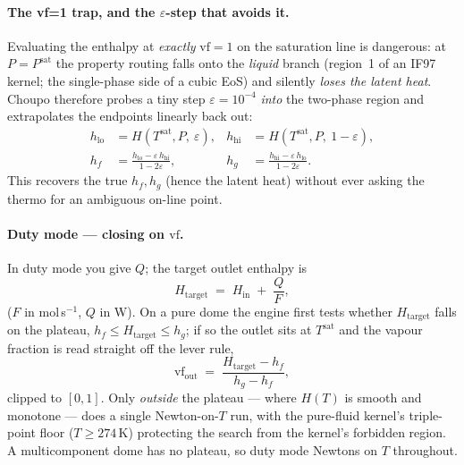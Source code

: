 \documentclass[11pt,a4paper]{article}
\newcommand{\Psat}{P^{\mathrm{sat}}}
\begin{document}
\paragraph{The vf=1 trap, and the $\varepsilon$-step that avoids it.}  Evaluating
the enthalpy at \emph{exactly} $\mathrm{vf}=1$ on the saturation line is
dangerous: at $P = \Psat$ the property routing falls onto the \emph{liquid}
branch (region~1 of an IF97 kernel; the single-phase side of a cubic EoS) and
silently \emph{loses the latent heat}.  Choupo therefore probes a tiny step
$\varepsilon = 10^{-4}$ \emph{into} the two-phase region and extrapolates the
endpoints linearly back out:
\begin{align}
  h_{\mathrm{lo}} &= H(T^{\mathrm{sat}},P,\ \varepsilon),
  & h_{\mathrm{hi}} &= H(T^{\mathrm{sat}},P,\ 1-\varepsilon), \nonumber\\
  h_f &= \frac{h_{\mathrm{lo}} - \varepsilon\,h_{\mathrm{hi}}}{1-2\varepsilon},
  & h_g &= \frac{h_{\mathrm{hi}} - \varepsilon\,h_{\mathrm{lo}}}{1-2\varepsilon}.
  \label{eq:pc-hfhg}
\end{align}
This recovers the true $h_f,h_g$ (hence the latent heat) without ever asking the
thermo for an ambiguous on-line point.

\paragraph{Duty mode --- closing on $\mathrm{vf}$.}  In duty mode you give $Q$;
the target outlet enthalpy is
\begin{equation}
  H_{\mathrm{target}} \;=\; H_{\mathrm{in}} \;+\; \frac{Q}{F\,},
  \label{eq:pc-Htarget}
\end{equation}
($F$ in mol\,s$^{-1}$, $Q$ in W).  On a pure dome the engine first tests whether
$H_{\mathrm{target}}$ falls on the plateau, $h_f \le H_{\mathrm{target}} \le
h_g$; if so the outlet sits at $T^{\mathrm{sat}}$ and the vapour fraction is read
straight off the lever rule,
\begin{equation}
  \mathrm{vf}_{\mathrm{out}} \;=\;
     \frac{H_{\mathrm{target}} - h_f}{h_g - h_f},
  \label{eq:pc-lever}
\end{equation}
clipped to $[0,1]$.  Only \emph{outside} the plateau --- where $H(T)$ is smooth
and monotone --- does a single Newton-on-$T$ run, with the pure-fluid kernel's
triple-point floor ($T \ge 274\,$K) protecting the search from the kernel's
forbidden region.  A multicomponent dome has no plateau, so duty mode Newtons on
$T$ throughout.
\end{document}
